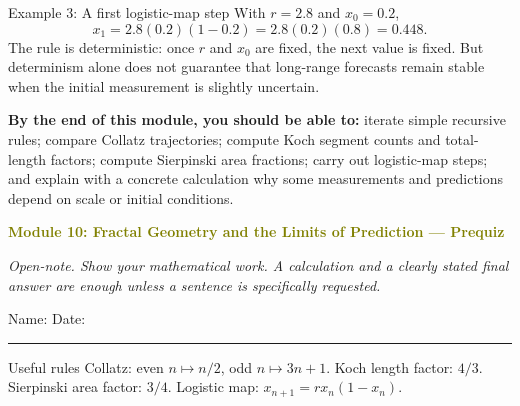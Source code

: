 \documentclass[11pt]{article}
\newcommand{\prequizhead}[2]{%
  \clearpage
  {\Large\bfseries\textcolor{olive}{Module #1: #2 — Prequiz}}\par
  \textit{Open-note. Show your mathematical work. A calculation and a clearly stated final answer are enough unless a sentence is specifically requested.}\par
  Name: \hspace{2.6in} Date: \hspace{1.1in}\par
  \vspace{2pt}\textcolor{gold}{\rule{\linewidth}{1.2pt}}\par\smallskip
}
\begin{document}
\begin{examplebox}{Example 3: A first logistic-map step}
With \(r=2.8\) and \(x_0=0.2\),
\[
x_1=2.8(0.2)(1-0.2)=2.8(0.2)(0.8)=0.448.
\]
The rule is deterministic: once \(r\) and \(x_0\) are fixed, the next value is fixed. But determinism alone does not guarantee that long-range forecasts remain stable when the initial measurement is slightly uncertain.
\end{examplebox}

\textbf{By the end of this module, you should be able to:} iterate simple recursive rules; compare Collatz trajectories; compute Koch segment counts and total-length factors; compute Sierpinski area fractions; carry out logistic-map steps; and explain with a concrete calculation why some measurements and predictions depend on scale or initial conditions.

\prequizhead{10}{Fractal Geometry and the Limits of Prediction}
\begin{refbox}{Useful rules}
Collatz: even \(n\mapsto n/2\), odd \(n\mapsto3n+1\). Koch length factor: \(4/3\). Sierpinski area factor: \(3/4\). Logistic map: \(x_{n+1}=rx_n(1-x_n)\).
\end{refbox}
\end{document}
